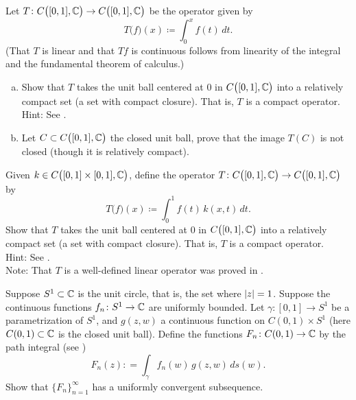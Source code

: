 \begin{exercise}
Let $T \colon C\bigl([0,1],{\mathbb{C}}\bigr) \to C\bigl([0,1],{\mathbb{C}}\bigr)$ be the operator
given by
\begin{equation*}
T\bigl(f\bigr) (x) \coloneqq \int_0^x f(t)\, dt .
\end{equation*}
(That $T$ is linear and that $Tf$ is continuous follows from
linearity of the integral and
the fundamental theorem of calculus.)
\begin{enumerate}[a)]
\item
Show that $T$ takes the unit ball centered at 0 in $C\bigl([0,1],{\mathbb{C}}\bigr)$ into a
relatively compact set (a set with compact closure).
That is, $T$ is a compact operator.\\
Hint: See .
\item
Let $C \subset C\bigl([0,1],{\mathbb{C}}\bigr)$ the closed unit ball,
prove that
the image $T(C)$ is not closed (though it is relatively compact).
\end{enumerate}
\end{exercise}

\begin{samepage}
\begin{exercise}
Given $k \in C\bigl([0,1]\times [0,1],{\mathbb{C}}\bigr)$,
define the operator
$T \colon C\bigl([0,1],{\mathbb{C}}\bigr) \to C\bigl([0,1],{\mathbb{C}}\bigr)$ by
\begin{equation*}
T\bigl(f\bigr)(x) \coloneqq  \int_0^1 f(t) \, k(x,t)\,dt .
\end{equation*}
Show that $T$ takes the unit ball centered at 0 in $C\bigl([0,1],{\mathbb{C}}\bigr)$ into a
relatively compact set (a set with compact closure).
That is, $T$ is a compact operator.\\
Hint: See .
\\
Note: That $T$ is a well-defined linear operator was proved in
.
\end{exercise}
\end{samepage}

\begin{exercise}
Suppose $S^1 \subset {\mathbb{C}}$ is the unit circle, that is, the set where
$\lvert {z} \rvert=1$.  Suppose the continuous functions
$f_n \colon S^1 \to {\mathbb{C}}$ are uniformly bounded.
Let $\gamma \colon [0,1] \to S^1$ be a parametrization of $S^1$,
and $g(z,w)$ a continuous function on $C(0,1) \times S^1$
(here $C(0,1) \subset {\mathbb{C}}$ is the closed unit ball).  Define
the functions $F_n \colon C(0,1) \to {\mathbb{C}}$ by
the path integral (see )
\begin{equation*}
F_n(z) : = \int_\gamma f_n(w)\, g(z,w) \, ds(w) . 
\end{equation*}
Show that $\{ F_n \}_{n=1}^\infty$ has a uniformly convergent subsequence.
\end{exercise}

